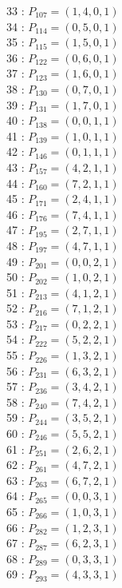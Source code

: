 \documentclass{article}
\begin{document}
{\begin{multicols}{3}
33 : $P_{107}=( 1, 4, 0, 1 )$\\
34 : $P_{114}=( 0, 5, 0, 1 )$\\
35 : $P_{115}=( 1, 5, 0, 1 )$\\
36 : $P_{122}=( 0, 6, 0, 1 )$\\
37 : $P_{123}=( 1, 6, 0, 1 )$\\
38 : $P_{130}=( 0, 7, 0, 1 )$\\
39 : $P_{131}=( 1, 7, 0, 1 )$\\
40 : $P_{138}=( 0, 0, 1, 1 )$\\
41 : $P_{139}=( 1, 0, 1, 1 )$\\
42 : $P_{146}=( 0, 1, 1, 1 )$\\
43 : $P_{157}=( 4, 2, 1, 1 )$\\
44 : $P_{160}=( 7, 2, 1, 1 )$\\
45 : $P_{171}=( 2, 4, 1, 1 )$\\
46 : $P_{176}=( 7, 4, 1, 1 )$\\
47 : $P_{195}=( 2, 7, 1, 1 )$\\
48 : $P_{197}=( 4, 7, 1, 1 )$\\
49 : $P_{201}=( 0, 0, 2, 1 )$\\
50 : $P_{202}=( 1, 0, 2, 1 )$\\
51 : $P_{213}=( 4, 1, 2, 1 )$\\
52 : $P_{216}=( 7, 1, 2, 1 )$\\
53 : $P_{217}=( 0, 2, 2, 1 )$\\
54 : $P_{222}=( 5, 2, 2, 1 )$\\
55 : $P_{226}=( 1, 3, 2, 1 )$\\
56 : $P_{231}=( 6, 3, 2, 1 )$\\
57 : $P_{236}=( 3, 4, 2, 1 )$\\
58 : $P_{240}=( 7, 4, 2, 1 )$\\
59 : $P_{244}=( 3, 5, 2, 1 )$\\
60 : $P_{246}=( 5, 5, 2, 1 )$\\
61 : $P_{251}=( 2, 6, 2, 1 )$\\
62 : $P_{261}=( 4, 7, 2, 1 )$\\
63 : $P_{263}=( 6, 7, 2, 1 )$\\
64 : $P_{265}=( 0, 0, 3, 1 )$\\
65 : $P_{266}=( 1, 0, 3, 1 )$\\
66 : $P_{282}=( 1, 2, 3, 1 )$\\
67 : $P_{287}=( 6, 2, 3, 1 )$\\
68 : $P_{289}=( 0, 3, 3, 1 )$\\
69 : $P_{293}=( 4, 3, 3, 1 )$\\

\end{multicols}}
\end{document}

